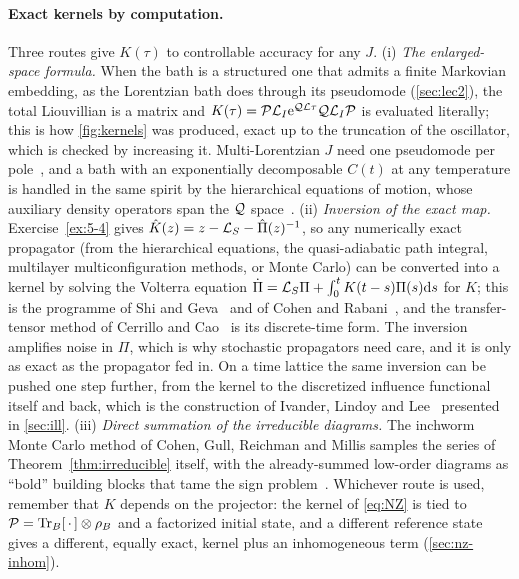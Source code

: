 \paragraph{Exact kernels by computation.}
Three routes give $K(\tau)$ to controllable accuracy for any $J$.
(i) \emph{The enlarged-space formula.}
When the bath is a structured one that admits a finite Markovian embedding, as the Lorentzian bath does through its pseudomode (\cref{sec:lec2}), the total Liouvillian is a matrix and $K(\tau)=\mathcal{P}\mathcal{L}_I\mathrm{e}^{\mathcal{Q}\mathcal{L}\tau}\mathcal{Q}\mathcal{L}_I\mathcal{P}$ is evaluated literally; this is how \cref{fig:kernels} was produced, exact up to the truncation of the oscillator, which is checked by increasing it.
Multi-Lorentzian $J$ need one pseudomode per pole~\cite{Tamascelli2018}, and a bath with an exponentially decomposable $C(t)$ at any temperature is handled in the same spirit by the hierarchical equations of motion, whose auxiliary density operators span the $\mathcal{Q}$ space~\cite{Tanimura2020}.
(ii) \emph{Inversion of the exact map.}
Exercise~\ref{ex:5-4} gives $\hat K(z)=z-\mathcal{L}_S-\hat\Pi(z)^{-1}$, so any numerically exact propagator (from the hierarchical equations, the quasi-adiabatic path integral, multilayer multiconfiguration methods, or Monte Carlo) can be converted into a kernel by solving the Volterra equation $\dot\Pi=\mathcal{L}_S\Pi+\int_0^tK(t-s)\Pi(s)\mathrm{d} s$ for $K$; this is the programme of Shi and Geva~\cite{ShiGeva2003} and of Cohen and Rabani~\cite{CohenRabani2011}, and the transfer-tensor method of Cerrillo and Cao~\cite{CerrilloCao2014} is its discrete-time form.
The inversion amplifies noise in $\Pi$, which is why stochastic propagators need care, and it is only as exact as the propagator fed in.
On a time lattice the same inversion can be pushed one step further, from the kernel to the discretized influence functional itself and back, which is the construction of Ivander, Lindoy and Lee~\cite{IvanderLindoyLee2024} presented in \cref{sec:ill}.
(iii) \emph{Direct summation of the irreducible diagrams.}
The inchworm Monte Carlo method of Cohen, Gull, Reichman and Millis samples the series of Theorem~\ref{thm:irreducible} itself, with the already-summed low-order diagrams as ``bold'' building blocks that tame the sign problem~\cite{CohenGullReichmanMillis2015,ChenCohenReichman2017}.
Whichever route is used, remember that $K$ depends on the projector: the kernel of \cref{eq:NZ} is tied to $\mathcal{P}=\operatorname{Tr}_B[\,\cdot\,]\otimes\rho_{B}$ and a factorized initial state, and a different reference state gives a different, equally exact, kernel plus an inhomogeneous term (\cref{sec:nz-inhom}).

